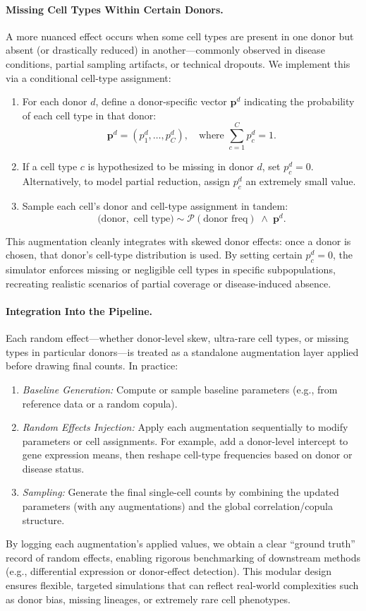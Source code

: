 \documentclass{article}
\begin{document}
\paragraph{Missing Cell Types Within Certain Donors.}
A more nuanced effect occurs when some cell types are present in one donor but absent (or drastically reduced) in another---commonly observed in disease conditions, partial sampling artifacts, or technical dropouts. We implement this via a conditional cell-type assignment:
\begin{enumerate}
	\item For each donor $d$, define a donor-specific vector $\mathbf{p}^d$ indicating the probability of each cell type in that donor:
	\[
	\mathbf{p}^d = (p^d_1,\ldots,p^d_C), \quad \text{where } \sum_{c=1}^{C} p^d_c = 1.
	\]
	\item If a cell type $c$ is hypothesized to be missing in donor $d$, set $p^d_c = 0$. Alternatively, to model partial reduction, assign $p^d_c$ an extremely small value.
	\item Sample each cell's donor and cell-type assignment in tandem:
	\[
	\text{(donor},\text{ cell type)} \sim \mathcal{P}(\text{donor freq}) \;\land\; \mathbf{p}^d.
	\]
\end{enumerate}
This augmentation cleanly integrates with skewed donor effects: once a donor is chosen, that donor's cell-type distribution is used. By setting certain $p^d_c=0$, the simulator enforces missing or negligible cell types in specific subpopulations, recreating realistic scenarios of partial coverage or disease-induced absence.

\paragraph{Integration Into the Pipeline.}
Each random effect---whether donor-level skew, ultra-rare cell types, or missing types in particular donors---is treated as a standalone augmentation layer applied before drawing final counts. In practice:
\begin{enumerate}
	\item \emph{Baseline Generation:} Compute or sample baseline parameters (e.g., from reference data or a random copula).
	\item \emph{Random Effects Injection:} Apply each augmentation sequentially to modify parameters or cell assignments. For example, add a donor-level intercept to gene expression means, then reshape cell-type frequencies based on donor or disease status.
	\item \emph{Sampling:} Generate the final single-cell counts by combining the updated parameters (with any augmentations) and the global correlation/copula structure.
\end{enumerate}
By logging each augmentation's applied values, we obtain a clear ``ground truth'' record of random effects, enabling rigorous benchmarking of downstream methods (e.g., differential expression or donor-effect detection). This modular design ensures flexible, targeted simulations that can reflect real-world complexities such as donor bias, missing lineages, or extremely rare cell phenotypes.
\end{document}
